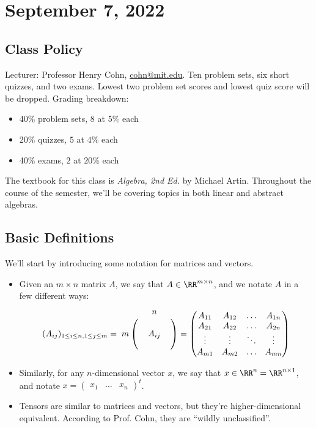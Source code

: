 \section{September 7, 2022}

\subsection{Class Policy}

Lecturer: Professor Henry Cohn, \url{cohn@mit.edu}. Ten problem sets, six short quizzes, and two exams. Lowest two problem set scores and lowest quiz score will be dropped. Grading breakdown:
\begin{itemize}
    \item 40\% problem sets, $8$ at $5\%$ each
    \item 20\% quizzes, $5$ at $4\%$ each
    \item 40\% exams, $2$ at $20\%$ each
\end{itemize}
The textbook for this class is \textit{Algebra, 2nd Ed.} by Michael Artin. Throughout the course of the semester, we'll be covering topics in both \ac{linear and abstract algebras}. 

\subsection{Basic Definitions}

\begin{definition}

We'll start by introducing some notation for matrices and vectors.
\end{definition}

\begin{itemize}
    \item Given an $m\times n$ matrix $A$, we say that $A\in \RR^{m\times n}$, and we notate $A$ in a few different ways:
\[(A_{ij})_{1\leq i\leq n, 1\leq j\leq m}=\bordermatrix{ &&n&\cr
                &&&\cr
                m&&A_{ij}&\cr
                &&&} = 
\begin{pmatrix}A_{11}&A_{12}&\hdots & A_{1n}\\
A_{21}&A_{22}&\hdots & A_{2n}\\
\vdots &\vdots &\ddots &\vdots \\
A_{m1}&A_{m2}&\hdots & A_{mn}
\end{pmatrix}\]
    \item Similarly, for any $n$-dimensional vector $x$, we say that $x\in \RR^n = \RR^{n\times 1}$, and notate $x=\begin{pmatrix}x_1 & \hdots & x_n\end{pmatrix}^t$.
    \item Tensors are similar to matrices and vectors, but they're higher-dimensional equivalent. According to Prof. Cohn, they are ``wildly unclassified''. 
\end{itemize}

